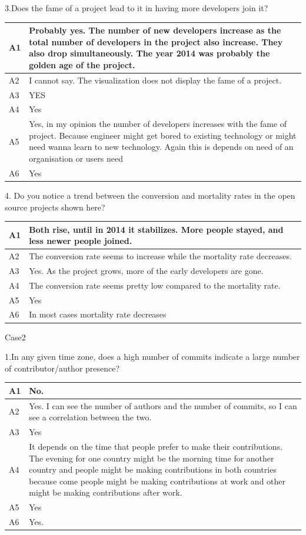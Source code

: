 \documentclass[double,12pt]{beavtex}
\begin{document}
3.Does the fame of a project lead to it in having more developers join it?


\begin{tabular}{ |p{2cm}|p{12cm}| }
 \hline
 A1 & Probably yes. The number of new developers increase as the total number of developers in the project also increase. They also drop simultaneously. The year 2014 was probably the golden age of the project.\\
 \hline
 A2 & I cannot say. The visualization does not display the fame of a project.\\ \hline
 A3 & YES\\ \hline
 A4 & Yes\\ \hline
 A5 & Yes, in my opinion the number of developers increases with the fame of project. Because engineer might get bored to existing technology or might need wanna learn to new technology. Again this is depends on need of an organisation or users need\\ \hline
 A6 & Yes\\
 \hline
\end{tabular}


4. Do you notice a trend between the conversion and mortality rates in the open source projects shown here?


\begin{tabular}{ |p{2cm}|p{12cm}| }
 \hline
 A1 & Both rise, until in 2014 it stabilizes. More people stayed, and less newer people joined.\\
 \hline
 A2 & The conversion rate seems to increase while the mortality rate decreases.\\ \hline
 A3 & Yes. As the project grows, more of the early developers are gone.\\ \hline
 A4 & The conversion rate seems pretty low compared to the mortality rate.\\ \hline
 A5 & Yes\\ \hline
 A6 & In most cases mortality rate decreases\\
 \hline
\end{tabular}


Case2


1.In any given time zone, does a high number of commits indicate a large number of contributor/author presence?


\begin{tabular}{ |p{2cm}|p{12cm}| }
 \hline
 A1 & No.\\
 \hline
 A2 & Yes. I can see the number of authors and the number of commits, so I can see a correlation between the two.\\ \hline
 A3 & Yes\\ \hline
 A4 & It depends on the time that people prefer to make their contributions. The evening for one country might be the morning time for another country and people might be making contributions in both countries because come people might be making contributions at work and other might be making contributions after work.\\ \hline
 A5 & Yes\\ \hline
 A6 & Yes.\\
 \hline
\end{tabular}
\end{document}
